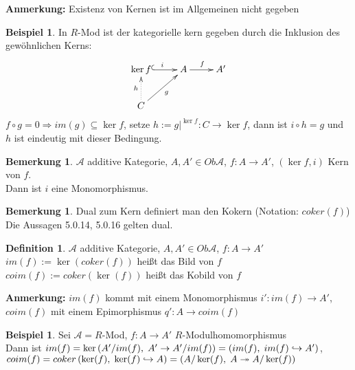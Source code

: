 \documentclass[10pt,a4paper,numbers=endperiod]{scrreprt}
\theoremstyle{definition}
\newtheorem{defi}[satz]{Definition}
\newtheorem{bem}[satz]{Bemerkung}
\newtheorem{bsp}[satz]{Beispiel}
\begin{document}
\textbf{Anmerkung:} Existenz von Kernen ist im Allgemeinen nicht gegeben

\begin{bsp}
	In $R$-Mod ist der kategorielle kern gegeben durch die Inklusion des gewöhnlichen Kerns: \begin{align*}
		\begin{xy}
		\xymatrix{
			\ker f \ar@{^{(}->}[r]^i & A \ar[r]^f & A'\\
			C \ar@{.>}[u]^h \ar[ur]_g & &	
		}
		\end{xy}
	\end{align*}
	$f \circ g = 0 \Rightarrow im (g) \subseteq \ker f$,  setze $h:= g|^{\ker f}: C \to \ker f$, dann ist $i \circ h =g$ und $h$ ist eindeutig mit dieser Bedingung.
\end{bsp}

\begin{bem}
	$\mathcal{A}$ additive Kategorie, $A, A' \in Ob \mathcal{A}$, $f: A \to A'$, $(\ker f, i)$ Kern von $f$.\\
	Dann ist $i$ eine Monomorphismus.
\end{bem}

\begin{bem}
	Dual zum Kern definiert man den Kokern (Notation: $coker(f)$)\\
	Die Aussagen 5.0.14, 5.0.16 gelten dual.
\end{bem}

\begin{defi}
	$\mathcal{A}$ additive Kategorie, $A, A' \in Ob \mathcal{A}$, $f: A \to A'$\\
	$im(f) := \ker(coker(f))$ heißt das Bild von $f$\\
	$coim(f) := coker(\ker(f))$ heißt das Kobild von $f$
\end{defi}

\textbf{Anmerkung:} $im(f)$ kommt mit einem Monomorphismus $i': im(f) \to A'$, $coim(f)$ mit einem Epimorphismus $q': A \to coim(f)$

\begin{bsp}
	Sei $\mathcal{A} = R$-Mod, $f: A \to A'$ $R$-Modulhomomorphismus\\
	Dann ist $im(f) = \ker\left(A'/im(f),\hspace*{1mm} A' \to A'/im(f)\right) = \left(im(f), \hspace*{1mm} im(f) \hookrightarrow A'\right)$,\\
	$coim(f) = coker\left(\ker(f), \hspace*{1mm} \ker(f) \hookrightarrow A\right) = \left(A/\ker(f), \hspace*{1mm} A \twoheadrightarrow A/\ker(f)\right)$
\end{bsp}
\end{document}
